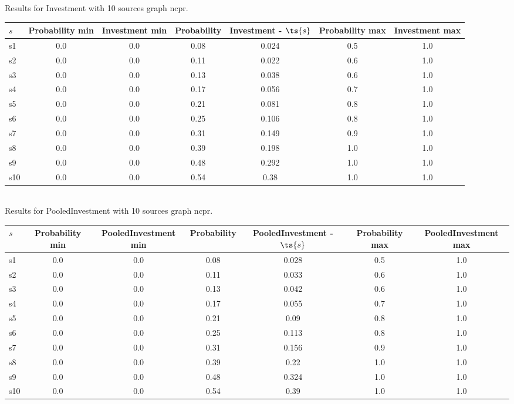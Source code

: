 \documentclass{article}
\begin{document}
\noindent Results for Investment with 10 sources graph ncpr.

\noindent\begin{tabular}{|l|c|c|c|c|c|c|}
\hline
$s$& Probability min & Investment min & Probability & Investment - $\ts{s}$ & Probability max & Investment max\\
\hline
s1 &0.0 & 0.0 & 0.08 & 0.024 & 0.5 & 1.0\\
\hline
s2 &0.0 & 0.0 & 0.11 & 0.022 & 0.6 & 1.0\\
\hline
s3 &0.0 & 0.0 & 0.13 & 0.038 & 0.6 & 1.0\\
\hline
s4 &0.0 & 0.0 & 0.17 & 0.056 & 0.7 & 1.0\\
\hline
s5 &0.0 & 0.0 & 0.21 & 0.081 & 0.8 & 1.0\\
\hline
s6 &0.0 & 0.0 & 0.25 & 0.106 & 0.8 & 1.0\\
\hline
s7 &0.0 & 0.0 & 0.31 & 0.149 & 0.9 & 1.0\\
\hline
s8 &0.0 & 0.0 & 0.39 & 0.198 & 1.0 & 1.0\\
\hline
s9 &0.0 & 0.0 & 0.48 & 0.292 & 1.0 & 1.0\\
\hline
s10 &0.0 & 0.0 & 0.54 & 0.38 & 1.0 & 1.0\\
\hline
\end{tabular}\\

\noindent Results for PooledInvestment with 10 sources graph ncpr.

\noindent\begin{tabular}{|l|c|c|c|c|c|c|}
\hline
$s$& Probability min & PooledInvestment min & Probability & PooledInvestment - $\ts{s}$ & Probability max & PooledInvestment max\\
\hline
s1 &0.0 & 0.0 & 0.08 & 0.028 & 0.5 & 1.0\\
\hline
s2 &0.0 & 0.0 & 0.11 & 0.033 & 0.6 & 1.0\\
\hline
s3 &0.0 & 0.0 & 0.13 & 0.042 & 0.6 & 1.0\\
\hline
s4 &0.0 & 0.0 & 0.17 & 0.055 & 0.7 & 1.0\\
\hline
s5 &0.0 & 0.0 & 0.21 & 0.09 & 0.8 & 1.0\\
\hline
s6 &0.0 & 0.0 & 0.25 & 0.113 & 0.8 & 1.0\\
\hline
s7 &0.0 & 0.0 & 0.31 & 0.156 & 0.9 & 1.0\\
\hline
s8 &0.0 & 0.0 & 0.39 & 0.22 & 1.0 & 1.0\\
\hline
s9 &0.0 & 0.0 & 0.48 & 0.324 & 1.0 & 1.0\\
\hline
s10 &0.0 & 0.0 & 0.54 & 0.39 & 1.0 & 1.0\\
\hline
\end{tabular}\\
\end{document}

